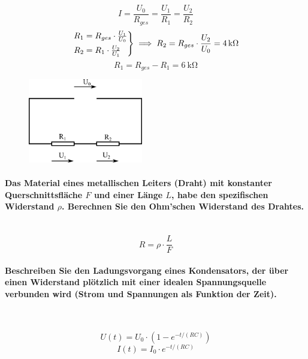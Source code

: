 \documentclass[a4paper, 11pt, ngerman, parskip=half-]{scrartcl}
\begin{document}
\begin{equation}
    I = \frac{U_0}{R_{ges}} = \frac{U_1}{R_1} = \frac{U_2}{R_2}
\end{equation}
\begin{equation}
    \begin{rcases}
        R_1 = R_{ges} \cdot \frac{U_1}{U_0} \\
        R_2 = R_1 \cdot \frac{U_2}{U_1}
    \end{rcases}
    \implies
    R_2 = R_{ges} \cdot \frac{U_2}{U_0} = \SI{4}{\kilo\ohm}
\end{equation}
\begin{equation}
    R_1 = R_{ges} - R_1 = \SI{6}{\kilo\ohm}
\end{equation}

\begin{figure}[H]
    \centering
    \includegraphics[width=5cm]{image/03/4}
\end{figure}

\paragraph{Das Material eines metallischen Leiters (Draht) mit konstanter Querschnittsfläche $F$ und
    einer Länge $L$, habe den spezifischen Widerstand $\rho$. Berechnen Sie den Ohm'schen Widerstand des
    Drahtes.} ~
\begin{equation}
    R = \rho \cdot \frac{L}{F}
\end{equation}

\paragraph{Beschreiben Sie den Ladungsvorgang eines Kondensators, der über einen Widerstand
    plötzlich mit einer idealen Spannungsquelle verbunden wird (Strom und Spannungen als Funktion der
    Zeit).} ~

\begin{equation}
    U(t) = U_0 \cdot \left( 1 - e^{-t /(R C)} \right)
\end{equation}
\begin{equation}
    I(t) = I_0 \cdot e^{-t /(R C)}
\end{equation}
\end{document}
